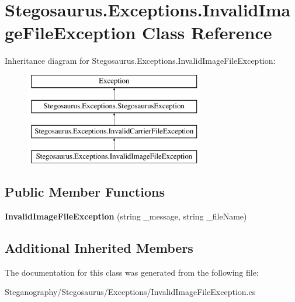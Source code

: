 \hypertarget{class_stegosaurus_1_1_exceptions_1_1_invalid_image_file_exception}{}\section{Stegosaurus.\+Exceptions.\+Invalid\+Image\+File\+Exception Class Reference}
\label{class_stegosaurus_1_1_exceptions_1_1_invalid_image_file_exception}
Inheritance diagram for Stegosaurus.\+Exceptions.\+Invalid\+Image\+File\+Exception\+:\begin{figure}[H]
\begin{center}
\leavevmode
\includegraphics[height=4.000000cm]{class_stegosaurus_1_1_exceptions_1_1_invalid_image_file_exception}
\end{center}
\end{figure}
\subsection*{Public Member Functions}
\begin{DoxyCompactItemize}
\item 
{\bfseries Invalid\+Image\+File\+Exception} (string \+\_\+message, string \+\_\+file\+Name)\hypertarget{class_stegosaurus_1_1_exceptions_1_1_invalid_image_file_exception_ac833fccf38eca8e754118508b8b6b635}{}\label{class_stegosaurus_1_1_exceptions_1_1_invalid_image_file_exception_ac833fccf38eca8e754118508b8b6b635}

\end{DoxyCompactItemize}
\subsection*{Additional Inherited Members}


The documentation for this class was generated from the following file\+:\begin{DoxyCompactItemize}
\item 
Steganography/\+Stegosaurus/\+Exceptions/Invalid\+Image\+File\+Exception.\+cs\end{DoxyCompactItemize}
